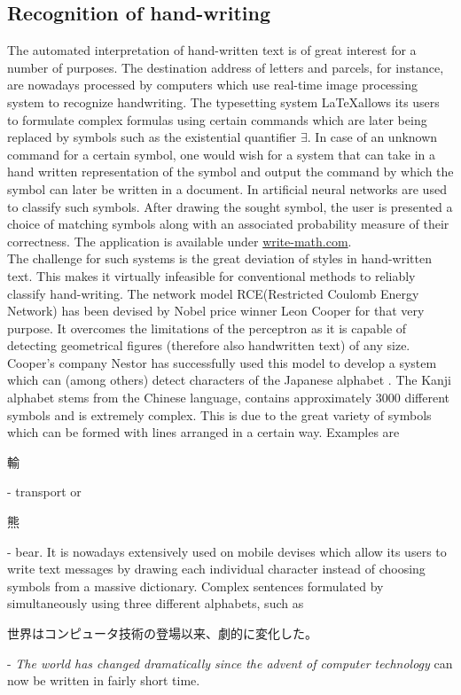 \documentclass[10pt,a4paper,DIV=11]{scrreprt}
\begin{document}
\subsection{Recognition of hand-writing}
The automated interpretation of hand-written text is of great interest for a number of purposes. The destination address of letters and parcels,
for instance, are nowadays processed by computers which use real-time image processing system to recognize handwriting. The typesetting system 
\LaTeX allows its users to formulate complex formulas using certain commands which are later being replaced by symbols such as the existential 
quantifier $\exists$. In case of an unknown command for a certain symbol, one would wish for a system that can take in a hand written representation 
of the symbol and output the command by which the symbol can later be written in a document. In \cite{MARTIN} artificial neural networks are used 
to classify such symbols. After drawing the sought symbol, the user is presented a choice of matching symbols along with an 
associated probability measure of their correctness. The application is available under \url{write-math.com}.
\\
The challenge for such systems is the great deviation of styles in hand-written text. This makes it virtually infeasible for conventional methods 
to reliably classify hand-writing. The network model RCE(Restricted Coulomb Energy Network) has been devised by Nobel price winner Leon Cooper for 
that very purpose. It overcomes the limitations of the perceptron as it is capable of detecting geometrical figures (therefore also handwritten text) 
of any size. Cooper's company Nestor has successfully used this model to develop a system which can (among others) detect characters of the Japanese alphabet .
The Kanji alphabet stems from the Chinese language, contains approximately 3000 different symbols and is extremely complex. This is due to the great
variety of symbols which can  be formed with lines arranged in a certain way. Examples are \begin{CJK}{UTF8}{min}輸\end{CJK} - transport or 
\begin{CJK}{UTF8}{min}熊\end{CJK} - bear. It is nowadays extensively used on mobile devises which allow its users to write text messages by drawing 
each individual character instead of choosing symbols from a massive dictionary. Complex sentences formulated by simultaneously using three different
alphabets, such as \begin{CJK}{UTF8}{min}世界はコンピュータ技術の登場以来、劇的に変化した。\end{CJK} - \textit{The world has changed dramatically 
since the advent of computer technology} can now be written in fairly short time.
\end{document}
